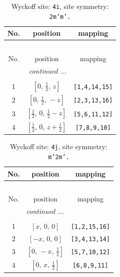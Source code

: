 \documentclass[fleqn,8pt]{jsarticle}
\begin{document}
\renewcommand{\arraystretch}{1.2}
\begin{longtable}{ccc}
\caption{Wyckoff site: {\tt 4i}, site symmetry: {\tt 2m'm'.}}
 \\
 \hline \hline
No. & position & mapping \\ \hline \endfirsthead

\multicolumn{2}{l}{\tablename\ \thetable{}} \\
 \hline \hline
No. & position & mapping \\ \hline \endhead

 \hline \hline
\multicolumn{2}{r}{\footnotesize\it continued ...} \\ \endfoot

 \hline \hline
\multicolumn{2}{r}{} \\ \endlastfoot

1 & $\left[ 0,\, \frac{1}{2},\, z \right]$ & {\tt [1,4,14,15]} \\ \hline
2 & $\left[ 0,\, \frac{1}{2},\, - z \right]$ & {\tt [2,3,13,16]} \\ \hline
3 & $\left[ \frac{1}{2},\, 0,\, \frac{1}{2} - z \right]$ & {\tt [5,6,11,12]} \\ \hline
4 & $\left[ \frac{1}{2},\, 0,\, z + \frac{1}{2} \right]$ & {\tt [7,8,9,10]} \\
\end{longtable}
\renewcommand{\arraystretch}{1.2}
\begin{longtable}{ccc}
\caption{Wyckoff site: {\tt 4j}, site symmetry: {\tt m'2m'.}}
 \\
 \hline \hline
No. & position & mapping \\ \hline \endfirsthead

\multicolumn{2}{l}{\tablename\ \thetable{}} \\
 \hline \hline
No. & position & mapping \\ \hline \endhead

 \hline \hline
\multicolumn{2}{r}{\footnotesize\it continued ...} \\ \endfoot

 \hline \hline
\multicolumn{2}{r}{} \\ \endlastfoot

1 & $\left[ x,\, 0,\, 0 \right]$ & {\tt [1,2,15,16]} \\ \hline
2 & $\left[ - x,\, 0,\, 0 \right]$ & {\tt [3,4,13,14]} \\ \hline
3 & $\left[ 0,\, - x,\, \frac{1}{2} \right]$ & {\tt [5,7,10,12]} \\ \hline
4 & $\left[ 0,\, x,\, \frac{1}{2} \right]$ & {\tt [6,8,9,11]} \\
\end{longtable}
\end{document}
